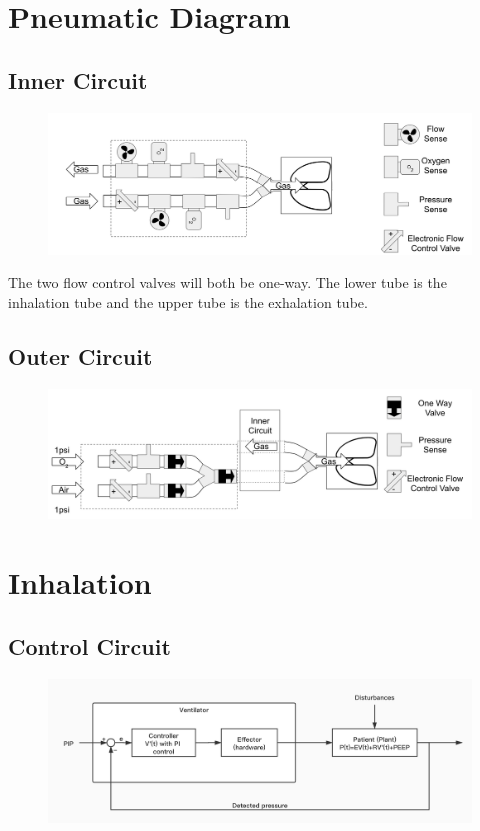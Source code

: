 \documentclass{article}
\begin{document}
\section{Pneumatic Diagram}
\subsection{Inner Circuit}
\begin{figure}[h]
\centering
\includegraphics[scale=0.25]{pneumatic-diagram-inner.png}
\end{figure}

The two flow control valves will both be one-way. The lower tube is the inhalation tube and the upper tube is the exhalation tube.

\subsection{Outer Circuit}
\begin{figure}[h]
\centering
\includegraphics[scale=0.25]{pneumatic-diagram-outer.png}
\end{figure}

\newpage

\section{Inhalation}
\subsection{Control Circuit}
\begin{figure}[h]
\centering
\includegraphics[scale=0.23]{control-circuit.jpg}
\end{figure}
\end{document}

